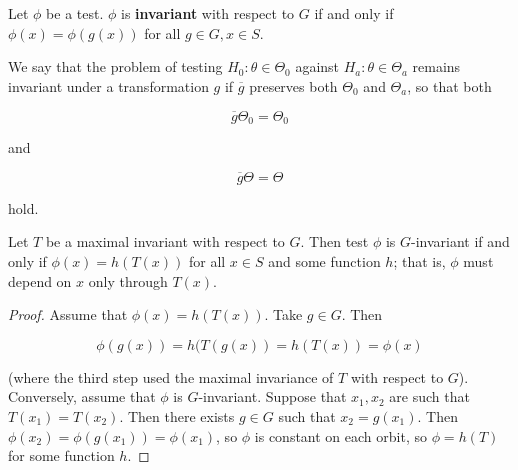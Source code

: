 \begin{definition}

Let \(\phi\) be a test. \(\phi\) is \textbf{invariant} with respect to \(G\) if and only if \(\phi(x) = \phi(g(x))\) for all \(g \in G, x \in S\).

\end{definition}

\begin{definition}

We say that the problem of testing \(H_0: \theta \in \Theta_0\) against \(H_a: \theta \in \Theta_a\) remains invariant under a transformation \(g\) if \(\overline{g}\) preserves both \(\Theta_0\) and \(\Theta_a\), so that both

\[
\overline{g} \Theta_0 = \Theta_0
\]

and

\[
\overline{g} \Theta = \Theta
\]

hold.


\end{definition}

\begin{theorem}

Let \(T\) be a maximal invariant with respect to \(G\). Then test \(\phi\) is \(G\)-invariant if and only if \(\phi(x) = h(T(x))\) for all \(x \in S\) and some function \(h\); that is, \(\phi\) must depend on \(x\) only through \(T(x)\). 

\end{theorem}

\begin{proof}

Assume that \(\phi(x) = h(T(x))\). Take \(g \in G\). Then

\[
\phi(g(x)) = h(T(g(x)) = h(T(x)) = \phi(x)
\]

(where the third step used the maximal invariance of \(T\) with respect to \(G\)). Conversely, assume that \(\phi\) is \(G\)-invariant. Suppose that \(x_1, x_2\) are such that \(T(x_1) = T(x_2)\). Then there exists \(g \in G\) such that \(x_2 = g(x_1)\). Then \(\phi(x_2) = \phi(g(x_1)) = \phi(x_1)\), so \(\phi\) is constant on each orbit, so \(\phi = h(T)\) for some function \(h\).

\end{proof}

